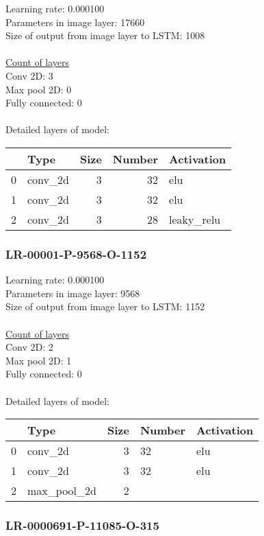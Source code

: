 Learning rate: 0.000100
\\Parameters in image layer: 17660
\\Size of output from image layer to LSTM: 1008
\\\\\underline{Count of layers} 
\\Conv 2D:           3\\Max pool 2D:      0\\Fully connected:  0
\\\\Detailed layers of model: \\\begin{tabular}{rlrrl}
\hline
    & Type    &   Size &   Number & Activation   \\
\hline
  0 & conv\_2d &      3 &       32 & elu          \\
  1 & conv\_2d &      3 &       32 & elu          \\
  2 & conv\_2d &      3 &       28 & leaky\_relu   \\
\hline
\end{tabular}\subsubsection*{LR-00001-P-9568-O-1152}
Learning rate: 0.000100
\\Parameters in image layer: 9568
\\Size of output from image layer to LSTM: 1152
\\\\\underline{Count of layers} 
\\Conv 2D:           2\\Max pool 2D:      1\\Fully connected:  0
\\\\Detailed layers of model: \\\begin{tabular}{rlrll}
\hline
    & Type        &   Size & Number   & Activation   \\
\hline
  0 & conv\_2d     &      3 & 32       & elu          \\
  1 & conv\_2d     &      3 & 32       & elu          \\
  2 & max\_pool\_2d &      2 &          &              \\
\hline
\end{tabular}\subsubsection*{LR-0000691-P-11085-O-315}
